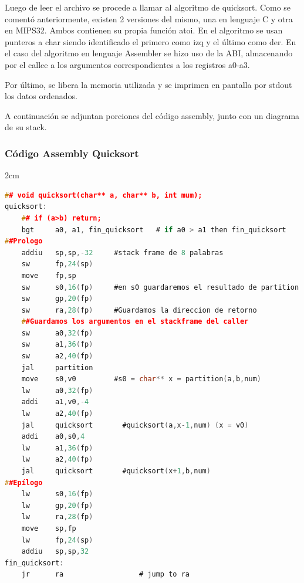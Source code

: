 \documentclass[a4paper,10pt]{article}
\numberwithin{equation}{section}
\numberwithin{figure}{section}
\begin{document}
Luego de leer el archivo se procede a llamar al algoritmo de quicksort. Como se comentó anteriormente, existen 2 versiones del mismo, una en lenguaje C y otra en MIPS32. Ambos contienen su propia función atoi. En el algoritmo se usan punteros a char siendo identificado el primero como izq y el último como der. En el caso del algoritmo en lenguaje Assembler se hizo uso de la ABI, almacenando por el callee a los argumentos correspondientes a los registros a0-a3.

Por último, se libera la memoria utilizada y se imprimen en pantalla por stdout los datos ordenados.


A continuación se adjuntan porciones del código assembly, junto con un diagrama de su stack.


\subsubsection{Código Assembly Quicksort}
\setmargins{2cm}{1.5cm}{13.5cm}{23.42cm}{10pt}{1cm}{0pt}
{2cm}
\begin{lstlisting}[language=c, numbers=none]
## void quicksort(char** a, char** b, int mum);
quicksort:
    ## if (a>b) return;
    bgt		a0, a1, fin_quicksort	# if a0 > a1 then fin_quicksort  
##Prologo
    addiu   sp,sp,-32     #stack frame de 8 palabras
    sw      fp,24(sp)
    move    fp,sp
    sw      s0,16(fp)     #en s0 guardaremos el resultado de partition
    sw      gp,20(fp)     
    sw      ra,28(fp)     #Guardamos la direccion de retorno
    ##Guardamos los argumentos en el stackframe del caller
    sw      a0,32(fp)
    sw      a1,36(fp)
    sw      a2,40(fp)
    jal     partition
    move    s0,v0         #s0 = char** x = partition(a,b,num)
    lw      a0,32(fp)     
    addi    a1,v0,-4
    lw      a2,40(fp)
    jal     quicksort       #quicksort(a,x-1,num) (x = v0)
    addi    a0,s0,4
    lw      a1,36(fp)
    lw      a2,40(fp)
    jal     quicksort       #quicksort(x+1,b,num)
##Epílogo
    lw      s0,16(fp)
    lw      gp,20(fp)
    lw      ra,28(fp)
    move    sp,fp
    lw      fp,24(sp)
    addiu   sp,sp,32
fin_quicksort:
    jr		ra					# jump to ra

\end{lstlisting}
\end{document}
